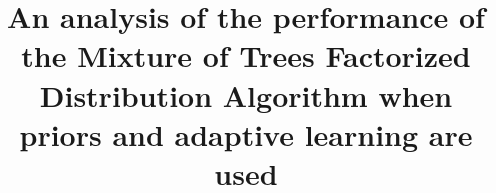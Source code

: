 \documentclass[runningheads]{llncs}
\begin{document}
 
 
   
\newlength{\TTL}
\newlength{\TMPL}
\newcommand*{\Let}[2]{\ensuremath{#1\Leftarrow#2}}
\newcommand*{\AlgoStep}[1]{Step {#1}}
\makeatletter
\newenvironment{BAlgo}[2][1]{%
  \newcommand*{\For}[2]{\textbf{for} $##1$ \textbf{to} $##2$}
  \newcommand*{\If}{\textbf{if }}
  \newcommand*{\Then}{\textbf{then }}
  \newcommand*{\Else}{\textbf{else}\xspace}
  \newcommand*{\End}{\} }
  \newcommand*{\Do}{\textbf{do} \{ }
  \newcommand*{\Return}{\textbf{return}\xspace}
  \newcommand*{\Until}[1]{\} \textbf{until} ##1}
  \newcommand*{\While}[1]{\} \textbf{while} ##1}
  \newcommand*{\WhileDo}[1]{\textbf{while} ##1 \Do}
  \newcommand*{\T}[1]{\rule{3ex}{0pt}\setlength{\TMPL}{\TTL}\addtolength{\TMPL}{
-3ex}\parbox[t]{\TMPL}{\setlength{\baselineskip}{0pt}{##1}}}
  \newcommand*{\TT}[1]{\rule{6ex}{0pt}\setlength{\TMPL}{\TTL}\addtolength{\TMPL}
{-6ex}\parbox[t]{\TMPL}{\setlength{\baselineskip}{0pt}##1}}
  \newcommand*{\TTT}[1]{\rule{9ex}{0pt}\setlength{\TMPL}{\TTL}\addtolength{\TMPL
}{-9ex}\parbox[t]{\TMPL}{\setlength{\baselineskip}{0pt}##1}}
  \begin{figure}[htb]\refstepcounter{algo}%
  \begin{minipage}{\textwidth}%
      \centerline{Algorithm~\thealgo: \textbf{#2}}\vspace{-1ex}%
       \centerline{\rule{0.93\textwidth}{0.5pt}}%
      \begin{list}{}{\setlength{\itemsep}{0pt}\setlength{\parsep}{3pt}%
          \setlength{\topsep}{0pt}\setlength{\parskip}{0pt}\setlength{\partopsep
}{0pt}%
          \setlength{\baselineskip}{0pt}%
          \setlength{\leftmargin}{2em}%
          \setcounter{AlgoStepCnt}{#1}%
          \setlength{\rightmargin}{1em}%
          \setlength{\TTL}{\textwidth}%
          \addtolength{\TTL}{-3em}                 
          \renewcommand{\makelabel}{\hfill\textit{\footnotesize{\arabic{AlgoStepCnt}}}\stepcounter{AlgoStepCnt}~}%
          } }%
      {\end{list}
 
      \centerline{\rule[1ex]{0.93\textwidth}{0.5pt}}
      \end{minipage}\end{figure}}




\mainmatter 
 
\title{An analysis of the performance of the Mixture of Trees Factorized Distribution Algorithm when
  priors and adaptive learning are used} 
 
\end{document}
